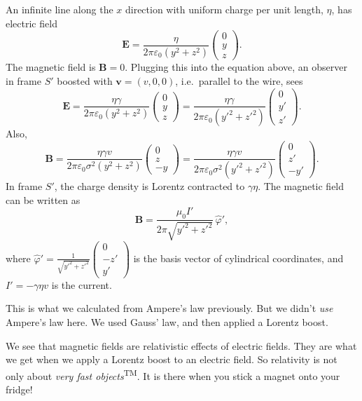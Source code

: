 \documentclass[a4paper]{article}
\begin{document}
\begin{eg}
  An infinite line along the $x$ direction with uniform charge per unit length, $\eta$, has electric field
  \[
    \mathbf{E} = \frac{\eta}{2\pi \varepsilon_0 (y^2 + z^2)}
    \begin{pmatrix}
      0\\ y\\ z
    \end{pmatrix}.
  \]
  The magnetic field is $\mathbf{B} = 0$. Plugging this into the equation above, an observer in frame $S'$ boosted with $\mathbf{v} = (v, 0, 0)$, i.e.\ parallel to the wire, sees
  \[
    \mathbf{E} = \frac{\eta\gamma}{2\pi\varepsilon_0(y^2 + z^2)}
    \begin{pmatrix}
      0\\y\\z
    \end{pmatrix} =
    \frac{\eta\gamma}{2\pi\varepsilon_0(y'^2 + z'^2)}
    \begin{pmatrix}
      0\\y'\\z'
    \end{pmatrix}.
  \]
  Also,
  \[
    \mathbf{B} = \frac{\eta\gamma v}{2\pi\varepsilon_0 \sigma^2(y^2 + z^2)}
    \begin{pmatrix}
      0\\z\\-y
    \end{pmatrix} = \frac{\eta\gamma v}{2\pi\varepsilon_0 \sigma^2(y'^2 + z'^2)}
    \begin{pmatrix}
      0\\z'\\-y'
    \end{pmatrix}.
  \]
  In frame $S'$, the charge density is Lorentz contracted to $\gamma\eta$. The magnetic field can be written as
  \[
    \mathbf{B} = \frac{\mu_0 I'}{2\pi \sqrt{y'^2 + z'^2}}\, \hat{\varphi}',
  \]
  where $\displaystyle \hat{\varphi}' = \frac{1}{\sqrt{y'^2 + z'^2}} \begin{pmatrix}0\\-z'\\y'\end{pmatrix}$ is the basis vector of cylindrical coordinates, and $I' = -\gamma\eta v$ is the current.

  This is what we calculated from Ampere's law previously. But we didn't \emph{use} Ampere's law here. We used Gauss' law, and then applied a Lorentz boost.
\end{eg}
We see that magnetic fields are relativistic effects of electric fields. They are what we get when we apply a Lorentz boost to an electric field. So relativity is not only about \emph{very fast objects}\textsuperscript{TM}. It is there when you stick a magnet onto your fridge!
\end{document}
